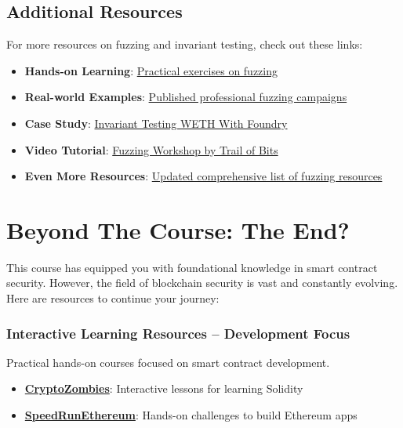 \documentclass[12pt]{article}
\begin{document}
\subsection*{Additional Resources}
\medskip
\noindent
For more resources on fuzzing and invariant testing, check out these links:
\begin{itemize}
    \item \textbf{Hands-on Learning}: \href{https://github.com/crytic/building-secure-contracts/tree/master/program-analysis/echidna/exercises}{Practical exercises on fuzzing}
    \item \textbf{Real-world Examples}: \href{https://github.com/perimetersec/public-fuzzing-campaigns-list}{Published professional fuzzing campaigns}
    \item \textbf{Case Study}: \href{https://mirror.xyz/horsefacts.eth/Jex2YVaO65dda6zEyfM_-DXlXhOWCAoSpOx5PLocYgw}{Invariant Testing WETH With Foundry}
    \item \textbf{Video Tutorial}: \href{https://www.youtube.com/playlist?list=PLciHOL_J7Iwqdja9UH4ZzE8dP1IxtsBXI}{Fuzzing Workshop by Trail of Bits}
    \item \textbf{Even More Resources}: \href{https://github.com/perimetersec/evm-fuzzing-resources?tab=readme-ov-file#evm-fuzzing-resources}{Updated comprehensive list of fuzzing resources}
\end{itemize}

\section{Beyond The Course: The End?}

This course has equipped you with foundational knowledge in smart contract
security. However, the field of blockchain security is vast and constantly
evolving. Here are resources to continue your journey:

\subsubsection*{Interactive Learning Resources -- Development Focus}

Practical hands-on courses focused on smart contract development.

\begin{itemize}
    \item \textbf{\href{https://cryptozombies.io/}{CryptoZombies}}: Interactive lessons for learning Solidity
    \item \textbf{\href{https://speedrunethereum.com/}{SpeedRunEthereum}}: Hands-on challenges to build Ethereum apps
\end{itemize}
\end{document}

